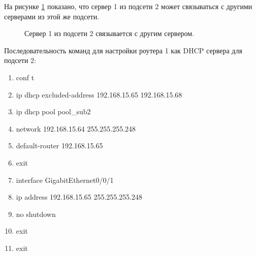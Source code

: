 \documentclass[a4paper,14pt]{article}
\begin{document}
 \newpage
 На рисунке \ref{fig:s21ping} показано, что сервер 1 из подсети 2 может связываться с другими серверами из этой же подсети.

 \begin{figure}[!h]
     \caption{Сервер 1 из подсети 2 связывается с другим сервером.}
     \label{fig:s21ping}
 \end{figure}

 \newpage
 Последовательность команд для настройки роутера 1 как DHCP сервера для подсети 2:

 \begin{enumerate}
     \item conf t
     \item ip dhcp excluded-address 192.168.15.65 192.168.15.68
     \item ip dhcp pool pool\_sub2
     \item network 192.168.15.64 255.255.255.248
     \item default-router 192.168.15.65
     \item exit
     \item interface GigabitEthernet0/0/1
     \item ip address 192.168.15.65 255.255.255.248
     \item no shutdown
     \item exit
     \item exit
 \end{enumerate}
\end{document}
